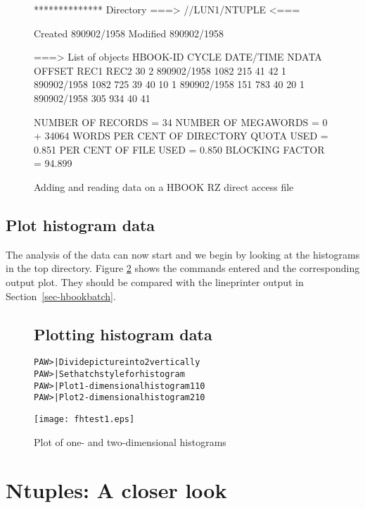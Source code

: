 \begin{figure}[p]
\begin{minipage}[t]{.49\linewidth}
\begin{talltt}
 ************** Directory ===> //LUN1/NTUPLE <===
 
                  Created 890902/1958  Modified 890902/1958
 
 ===> List of objects
     HBOOK-ID  CYCLE   DATE/TIME   NDATA   OFFSET    REC1    REC2
         30       2   890902/1958   1082     215      41      42
                  1   890902/1958   1082     725      39      40                              
         10       1   890902/1958    151     783      40
         20       1   890902/1958    305     934      40      41
 
  NUMBER OF RECORDS =   34  NUMBER OF MEGAWORDS =  0 + 34064 WORDS
  PER CENT OF DIRECTORY QUOTA USED =   0.851
  PER CENT OF FILE USED            =   0.850
  BLOCKING FACTOR                  =  94.899
\end{talltt}
\end{minipage}

\caption{Adding and reading data on a HBOOK RZ direct access file}
\label{fig:FEX2IN}
\end{figure}

\subsection{Plot histogram data}

The analysis of the data can now start and we begin by looking at the
histograms in the top directory.  Figure \ref{fig:FHTEST1} shows the
commands entered and the corresponding output plot. They should be
compared with the lineprinter output in Section~\ref{sec-hbookbatch}.

\begin{figure}
\subsection*{Plotting histogram data}
\begin{alltt}
      PAW >          | Divide picture into 2 vertically
      PAW >      | Set hatch style for histogram
      PAW >        | Plot 1-dimensional histogram 110
      PAW >        | Plot 2-dimensional histogram 210
\end{alltt}

\centering\texttt{[image: fhtest1.eps]}
\caption{Plot of one- and two-dimensional histograms}
\label{fig:FHTEST1}
\end{figure}

\section{Ntuples: A closer look}
\label{sec:NTUPLH2}

